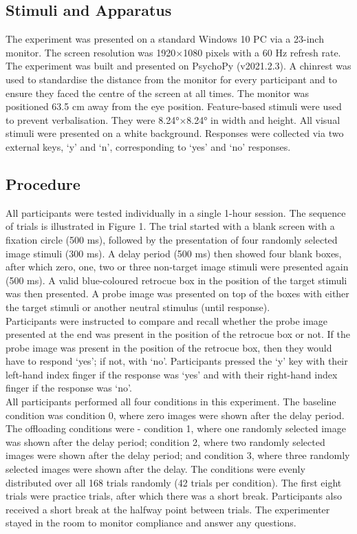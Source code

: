 \documentclass[
    a4paper,
    man,
    floatsintext,
    british
]{apa6}
\begin{document}
\subsection{Stimuli and Apparatus}
The experiment was presented on a standard Windows 10 PC via a 23-inch monitor. The screen resolution was 1920$\times$1080 pixels with a 60 Hz refresh rate. The experiment was built and presented on PsychoPy (v2021.2.3). A chinrest was used to standardise the distance from the monitor for every participant and to ensure they faced the centre of the screen at all times. The monitor was positioned 63.5 cm away from the eye position. Feature-based stimuli were used to prevent verbalisation. They were 8.24°$\times$8.24° in width and height. All visual stimuli were presented on a white background. Responses were collected via two external keys, ‘y’ and ‘n’, corresponding to ‘yes’ and ‘no’ responses. 
\subsection{Procedure}
All participants were tested individually in a single 1-hour session. The sequence of trials is illustrated in Figure 1. The trial started with a blank screen with a fixation circle (500 ms), followed by the presentation of four randomly selected image stimuli (300 ms). A delay period (500 ms) then showed four blank boxes, after which zero, one, two or three non-target image stimuli were presented again (500 ms). A valid blue-coloured retrocue box in the position of the target stimuli was then presented. A probe image was presented on top of the boxes with either the target stimuli or another neutral stimulus (until response). 
\\
Participants were instructed to compare and recall whether the probe image presented at the end was present in the position of the retrocue box or not. If the probe image was present in the position of the retrocue box, then they would have to respond ‘yes’; if not, with ‘no’. Participants pressed the ‘y’ key with their left-hand index finger if the response was ‘yes’ and with their right-hand index finger if the response was ‘no’. 
\\
All participants performed all four conditions in this experiment. The baseline condition was condition 0, where zero images were shown after the delay period. The offloading conditions were - condition 1, where one randomly selected image was shown after the delay period; condition 2, where two randomly selected images were shown after the delay period; and condition 3, where three randomly selected images were shown after the delay. The conditions were evenly distributed over all 168 trials randomly (42 trials per condition). The first eight trials were practice trials, after which there was a short break. Participants also received a short break at the halfway point between trials. The experimenter stayed in the room to monitor compliance and answer any questions.
\end{document}
